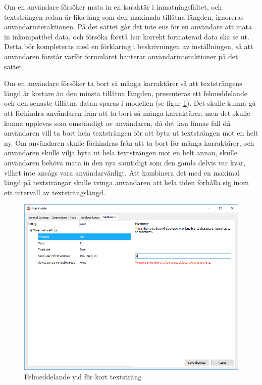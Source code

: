 Om en användare försöker mata in en karaktär i inmatningsfältet, och textsträngen redan är lika lång som den maximala tillåtna längden, ignoreras användarinteraktionen. På det sättet går det inte ens för en användare att mata in inkompatibel data, och försöka förstå hur korrekt formaterad data ska se ut. Detta bör kompleteras med en förklaring i beskrivningen av inställningen, så att användaren förstår varför formuläret hanterar användarinteraktioner på det sättet.

Om en användare försöker ta bort så många karraktärer så att textsträngens längd är kortare än den minsta tillåtna längden, presenteras ett felmeddelande och den senaste tillåtna datan sparas i modellen (se figur \ref{fig:textstrang-minLength}). Det skulle kunna gå att förhindra användaren från att ta bort så många karraktärer, men det skulle kunna upplevas som omständigt av användaren, då det kan finnas fall då användaren vill ta bort hela textsträngen för att byta ut textsträngen mot en helt ny. Om användaren skulle förhindras från att ta bort för många karraktärer, och användaren skulle vilja byta ut hela textsträngen mot en helt annan, skulle användaren behöva mata in den nya samtidigt som den gamla delvis var kvar, vilket inte ansågs vara användarvänligt. Att kombinera det med en maximal längd på textsträngar skulle tvinga användaren att hela tiden förhålla sig inom ett intervall av textsträngslängd.

\begin{figure}
	\includegraphics[width=\textwidth]{./images/gui/textstrang-minLength.png}
	\vspace{-1.7em}
	\caption{Felmeddelande vid för kort textsträng}
	\label{fig:textstrang-minLength}
\end{figure}

